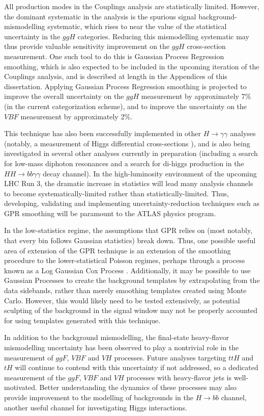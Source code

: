 All production modes in the Couplings analysis are statistically limited. However, the dominant systematic in the analysis is the spurious signal background-mismodelling systematic, which rises to near the value of the statistical uncertainty in the $ggH$ categories. Reducing this mismodelling systematic may thus provide valuable sensitivity improvement on the $ggH$ cross-section measurement. One such tool to do this is Gaussian Process Regression smoothing, which is also expected to be included in the upcoming iteration of the Couplings analysis, and is described at length in the Appendices of this dissertation. Applying Gaussian Process Regression smoothing is projected to improve the overall uncertainty on the $ggH$ measurement by approximately 7\% (in the current categorization scheme), and to improve the uncertainty on the $VBF$ measurement by approximately 2\%. 

This technique has also been successfully implemented in other $H \rightarrow \gamma \gamma$ analyses (notably, a measurement of Higgs differential cross-sections \cite{XSecs}), and is also being investigated in several other analyses currently in preparation (including a search for low-mass diphoton resonances and a search for di-higgs production in the $HH \rightarrow bb \gamma \gamma$ decay channel). In the high-luminosity environment of the upcoming LHC Run 3, the dramatic increase in statistics will lead many analysis channels to become systematically-limited rather than statistically-limited. Thus, developing, validating and implementing uncertainty-reduction techniques such as GPR smoothing will be paramount to the ATLAS physics program.

In the low-statistics regime, the assumptions that GPR relies on (most notably, that every bin follows Gaussian statistics) break down. Thus, one possible useful area of extension of the GPR technique is an extension of the smoothing procedure to the lower-statistical Poisson regimes, perhaps through a process known as a Log Gaussian Cox Process \cite{LogCox}. Additionally, it may be possible to use Gaussian Processes to create the background templates by extrapolating from the data sidebands, rather than merely smoothing templates created using Monte Carlo. However, this would likely need to be tested extensively, as potential sculpting of the background in the signal window may not be properly accounted for using templates generated with this technique.

In addition to the background mismodelling, the final-state heavy-flavor mismodelling uncertainty has been observed to play a nontrivial role in the measurement of $ggF$, $VBF$ and $VH$ processes. Future analyses targeting $ttH$ and $tH$ will continue to contend with this uncertainty if not addressed, so a dedicated measurement of the $ggF$, $VBF$ and $VH$ processes with heavy-flavor jets is well-motivated. Better understanding the dynamics of these processes may also provide improvement to the modelling of backgrounds in the $H \rightarrow bb$ channel, another useful channel for investigating Higgs interactions.

